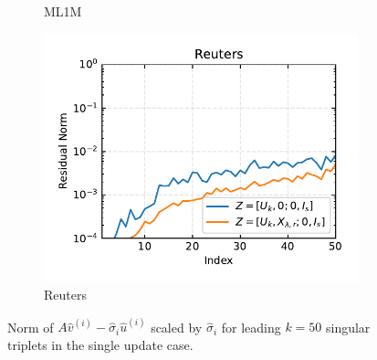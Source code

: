 \begin{figure}[h]
\begin{subfigure}[b]{0.3\textwidth}
        \caption{ML1M}
        \label{fig:single_ml1m_res_norm}
    \end{subfigure}
    \begin{subfigure}[b]{0.3\textwidth}
        \centering
        \includegraphics[width=\textwidth]{figures/single/reuters/residual_norms_reuters_batch_split_1.pdf}
        \caption{Reuters}
        \label{fig:single_reuters_res_norm}
    \end{subfigure}
    \caption{Norm of $A\hat{v}^{(i)} - \hat{\sigma}_i \hat{u}^{(i)}$ scaled by $\hat{\sigma}_i$ for leading $k=50$ singular triplets in the single update case.}
    \label{fig:single_res_norm}
\end{figure}